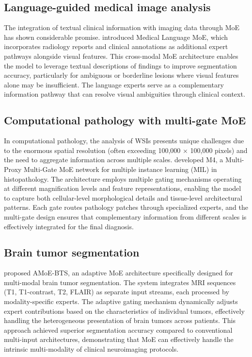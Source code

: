 \subsection*{Language-guided medical image analysis}

The integration of textual clinical information with imaging data through MoE has shown considerable promise. \cite{wang2025medical_language_moe} introduced Medical Language MoE, which incorporates radiology reports and clinical annotations as additional expert pathways alongside visual features. This cross-modal MoE architecture enables the model to leverage textual descriptions of findings to improve segmentation accuracy, particularly for ambiguous or borderline lesions where visual features alone may be insufficient. The language experts serve as a complementary information pathway that can resolve visual ambiguities through clinical context.

\subsection*{Computational pathology with multi-gate MoE}

In computational pathology, the analysis of WSIs presents unique challenges due to the enormous spatial resolution (often exceeding 100,000 $\times$ 100,000 pixels) and the need to aggregate information across multiple scales. \cite{li2025m4_moe} developed M4, a Multi-Proxy Multi-Gate MoE network for multiple instance learning (MIL) in histopathology. The architecture employs multiple gating mechanisms operating at different magnification levels and feature representations, enabling the model to capture both cellular-level morphological details and tissue-level architectural patterns. Each gate routes pathology patches through specialized experts, and the multi-gate design ensures that complementary information from different scales is effectively integrated for the final diagnosis.

\subsection*{Brain tumor segmentation}

\cite{kim2026amoe_bts} proposed AMoE-BTS, an adaptive MoE architecture specifically designed for multi-modal brain tumor segmentation. The system integrates MRI sequences (T1, T1-contrast, T2, FLAIR) as separate input streams, each processed by modality-specific experts. The adaptive gating mechanism dynamically adjusts expert contributions based on the characteristics of individual tumors, effectively handling the heterogeneous presentation of brain tumors across patients. This approach achieved superior segmentation accuracy compared to conventional multi-input architectures, demonstrating that MoE can effectively handle the intrinsic multi-modality of clinical neuroimaging protocols.

